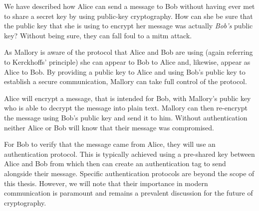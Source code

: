 We have described how Alice can send a message to Bob without having ever met to share a secret key by using public-key cryptography. How can she be sure that the public key that she is using to encrypt her message was actually \emph{Bob's} public key? Without being sure, they can fall foul to a \ac{mitm} attack.

As Mallory is aware of the protocol that Alice and Bob are using (again referring to Kerckhoffs' principle) she can appear to Bob to Alice and, likewise, appear as Alice to Bob. By providing a public key to Alice and using Bob's public key to establish a secure communication, Mallory can take full control of the protocol. 

Alice will encrypt a message, that is intended for Bob, with Mallory's public key who is able to decrypt the message into plain text. Mallory can then re-encrypt the message using Bob's public key and send it to him. Without authentication neither Alice or Bob will know that their message was compromised. 

For Bob to verify that the message came from Alice, they will use an authentication protocol. This is typically achieved using a pre-shared key between Alice and Bob from which then can create an authentication tag to send alongside their message. Specific authentication protocols are beyond the scope of this thesis. However, we will note that their importance in modern communication is paramount and remains a prevalent discussion for the future of cryptography. 





